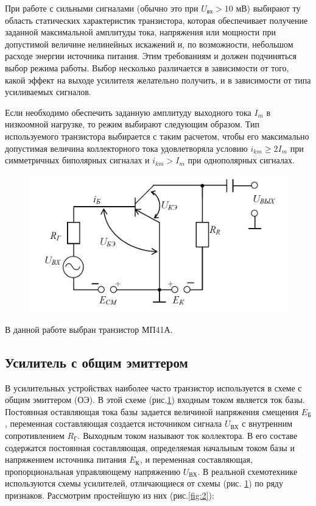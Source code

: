 При работе с сильными сигналами (обычно это при $U_{\text{вх}}>10$ мВ) выбирают ту область статических характеристик транзистора, которая обеспечивает получение заданной максимальной амплитуды тока, напряжения или мощности при допустимой величине
нелинейных искажений и, по возможности, небольшом расходе энергии источника питания. Этим требованиям и должен подчиняться выбор режима работы. Выбор несколько различается в зависимости от того, какой эффект на выходе усилителя желательно получить, и в зависимости от типа усиливаемых сигналов.

Если необходимо обеспечить заданную амплитуду выходного тока $I_m$ в низкоомной нагрузке, то режим выбирают следующим образом. Тип используемого транзистора выбирается с таким расчетом, чтобы его максимально допустимая величина коллекторного тока удовлетворяла условию $i_{km}\geqslant 2I_m$ при симметричных биполярных сигналах и $i_{km}>I_m$ при однополярных сигналах.

\begin{figure}[ht]
	\centering
	\includegraphics[width=0.5\linewidth]{fig/fig1}
	\caption{}
	\label{fig:1}
\end{figure}

В данной работе выбран транзистор МП41А.

\subsection{Усилитель с общим эмиттером}
В усилительных устройствах наиболее часто транзистор используется в схеме с общим эмиттером (ОЭ). В этой схеме (рис.\ref{fig:1}) входным током является ток базы. Постоянная оставляющая тока базы задается величиной напряжения смещения $E_{\text{Б}}$, переменная составляющая создается источником сигнала $U_{\text{ВХ}}$ с внутренним сопротивлением $R_{\text{Г}}$. Выходным током называют ток коллектора. В его составе содержатся постоянная составляющая, определяемая начальным током базы и напряжением источника питания $E_{\text{К}}$, и переменная составляющая, пропорциональная управляющему напряжению $U_{\text{ВХ}}$. В реальной схемотехнике используются схемы усилителей, отличающиеся от схемы (рис. \ref{fig:1}) по ряду признаков. Рассмотрим простейшую из них (рис.\ref{fig:2}):

